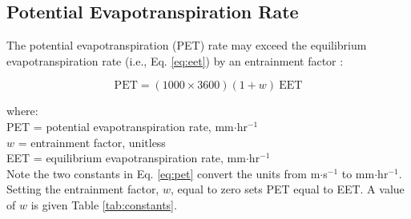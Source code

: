 \subsection{Potential Evapotranspiration Rate}
\label{sec:pet}
The potential evapotranspiration (PET) rate may exceed the equilibrium evapotranspiration rate (i.e., Eq. \ref{eq:eet}) by an entrainment factor \parencite{lhomme97, priestley72}:

\begin{equation}
\label{eq:pet}
	\text{PET} = \left(1000\times 3600\right) \left(1+w \right)\: \text{EET}
\end{equation}

\noindent where:\\
\indent PET = potential evapotranspiration rate, mm$\cdot$hr$^{-1}$\\
\indent $w$ = entrainment factor, unitless \\
\indent EET = equilibrium evapotranspiration rate, mm$\cdot$hr$^{-1}$\\

\noindent Note the two constants in Eq. \ref{eq:pet} convert the units from m$\cdot$s$^{-1}$ to mm$\cdot$hr$^{-1}$. Setting the entrainment factor, $w$, equal to zero sets PET equal to EET. 
A value of $w$ is given Table \ref{tab:constants}.

